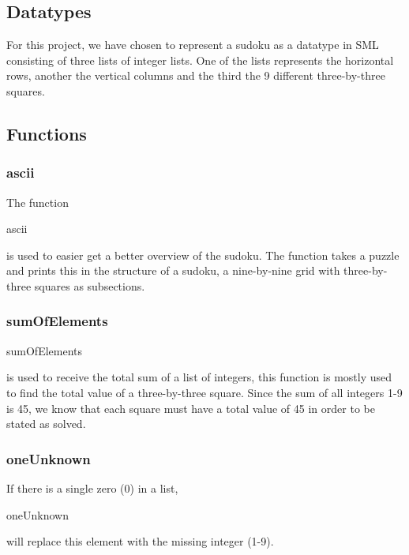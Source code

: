\documentclass[12pt, a4paper]{article}
\begin{document}
\begin{adjustwidth}{2em}{0pt}
		\subsection{Datatypes}
			\begin{adjustwidth}{3em}{0pt}
				For this project, we have chosen to represent a sudoku as a datatype in SML consisting of three lists of integer lists. One of the lists represents the horizontal rows, another the vertical columns and the third the 9 different three-by-three squares.

			\end{adjustwidth}

		\subsection{Functions}
			\begin{adjustwidth}{3em}{0pt}
				\subsubsection{ascii}
					\begin{adjustwidth}{3em}{0pt}
						The function \begin{ttfamily}ascii\end{ttfamily} is used to easier get a better overview of the sudoku. The function takes a puzzle and prints this in the structure of a sudoku, a nine-by-nine grid with three-by-three squares as subsections.
					\end{adjustwidth}

				\subsubsection{sumOfElements}
					\begin{adjustwidth}{3em}{0pt}
						\begin{ttfamily}sumOfElements\end{ttfamily} is used to receive the total sum of a list of integers, this function is mostly used to find the total value of a three-by-three square. Since the sum of all integers 1-9 is 45, we know that each square must have a total value of 45 in order to be stated as solved.
					\end{adjustwidth}

				\subsubsection{oneUnknown}
					\begin{adjustwidth}{3em}{0pt}
						If there is a single zero (0) in a list, \begin{ttfamily}oneUnknown\end{ttfamily} will replace this element with the missing integer (1-9).
					\end{adjustwidth}

\end{adjustwidth}
\end{adjustwidth}
\end{document}
